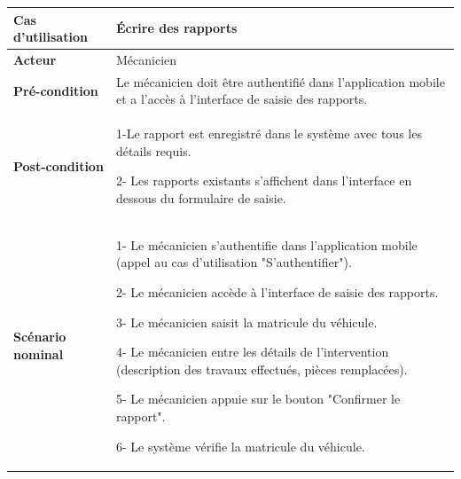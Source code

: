 \begin{table}[H]
    \centering
    \renewcommand{\arraystretch}{1}
    \begin{tabular}{|p{4cm}|p{9cm}|}
        \hline
        \textbf{Cas d'utilisation} & Écrire des rapports                                                                                              \\
        \hline
        \textbf{Acteur}            & Mécanicien                                                                                                       \\
        \hline
        \textbf{Pré-condition}     & Le mécanicien doit être authentifié dans l'application mobile et a l'accès à l'interface de saisie des rapports. \\


        \hline
        \textbf{Post-condition}    & 1-Le rapport est enregistré dans le système avec tous les détails requis.\newline

        2- Les rapports existants s'affichent dans l'interface en dessous du formulaire de saisie.                                                    \\
        \hline
        \textbf{Scénario nominal}  & 1- Le mécanicien s'authentifie dans l'application mobile (appel au cas d'utilisation "S'authentifier").\newline

        2- Le mécanicien accède à l'interface de saisie des rapports.\newline

        3- Le mécanicien saisit la matricule du véhicule.\newline

        4- Le mécanicien entre les détails de l'intervention (description des travaux effectués, pièces remplacées).\newline

        5- Le mécanicien appuie sur le bouton "Confirmer le rapport".\newline

        6- Le système vérifie la matricule du véhicule.                                                                                               \\
    \end{tabular}
\end{table}

\newpage

